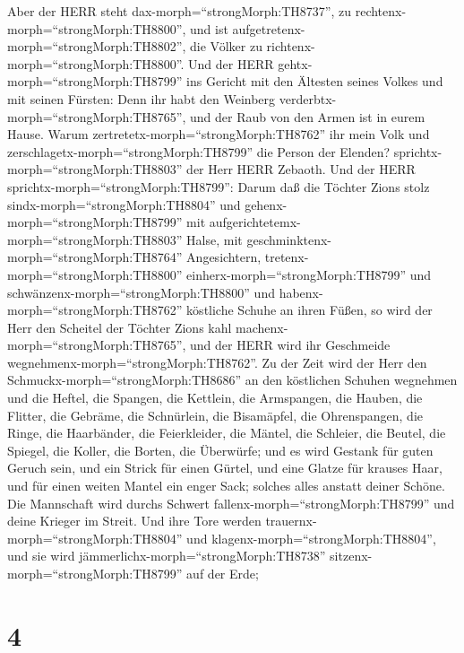  Aber der HERR steht dax-morph=``strongMorph:TH8737'', zu
rechtenx-morph=``strongMorph:TH8800'', und ist
aufgetretenx-morph=``strongMorph:TH8802'', die Völker zu
richtenx-morph=``strongMorph:TH8800''.  Und der HERR
gehtx-morph=``strongMorph:TH8799'' ins Gericht mit den Ältesten seines
Volkes und mit seinen Fürsten: Denn ihr habt den Weinberg
verderbtx-morph=``strongMorph:TH8765'', und der Raub von den Armen ist
in eurem Hause.  Warum
zertretetx-morph=``strongMorph:TH8762'' ihr mein Volk und
zerschlagetx-morph=``strongMorph:TH8799'' die Person der Elenden?
sprichtx-morph=``strongMorph:TH8803'' der Herr HERR Zebaoth.
 Und der HERR sprichtx-morph=``strongMorph:TH8799'': Darum
daß die Töchter Zions stolz sindx-morph=``strongMorph:TH8804'' und
gehenx-morph=``strongMorph:TH8799'' mit
aufgerichtetemx-morph=``strongMorph:TH8803'' Halse, mit
geschminktenx-morph=``strongMorph:TH8764'' Angesichtern,
tretenx-morph=``strongMorph:TH8800''
einherx-morph=``strongMorph:TH8799'' und
schwänzenx-morph=``strongMorph:TH8800'' und
habenx-morph=``strongMorph:TH8762'' köstliche Schuhe an ihren Füßen,
 so wird der Herr den Scheitel der Töchter Zions kahl
machenx-morph=``strongMorph:TH8765'', und der HERR wird ihr Geschmeide
wegnehmenx-morph=``strongMorph:TH8762''.  Zu der Zeit wird
der Herr den Schmuckx-morph=``strongMorph:TH8686'' an den köstlichen
Schuhen wegnehmen und die Heftel, die Spangen,  die
Kettlein, die Armspangen, die Hauben,  die Flitter, die
Gebräme, die Schnürlein, die Bisamäpfel, die Ohrenspangen, 
die Ringe, die Haarbänder,  die Feierkleider, die Mäntel,
die Schleier, die Beutel,  die Spiegel, die Koller, die
Borten, die Überwürfe;  und es wird Gestank für guten
Geruch sein, und ein Strick für einen Gürtel, und eine Glatze für
krauses Haar, und für einen weiten Mantel ein enger Sack; solches alles
anstatt deiner Schöne.  Die Mannschaft wird durchs Schwert
fallenx-morph=``strongMorph:TH8799'' und deine Krieger im Streit.
 Und ihre Tore werden trauernx-morph=``strongMorph:TH8804''
und klagenx-morph=``strongMorph:TH8804'', und sie wird
jämmerlichx-morph=``strongMorph:TH8738''
sitzenx-morph=``strongMorph:TH8799'' auf der Erde;

\hypertarget{section-3}{%
\section{4}\label{section-3}}

